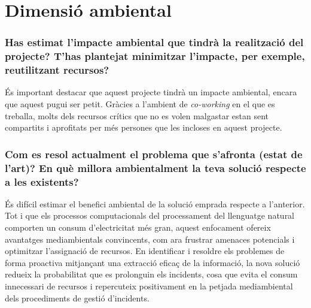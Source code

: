 \section{Dimensió ambiental}

\subsubsection{Has estimat l'impacte ambiental que tindrà la realització del projecte? T'has plantejat minimitzar l'impacte, per exemple, reutilitzant recursos?}
És important destacar que aquest projecte tindrà un impacte ambiental, encara que aquest pugui ser petit. Gràcies a l'ambient de \textit{co-working} en el que es treballa, molts dels recursos crítics que no es volen malgastar estan sent compartits i aprofitats per més persones que les incloses en aquest projecte.

\subsubsection{Com es resol actualment el problema que s'afronta (estat de l'art)? En què millora ambientalment la teva solució respecte a les existents?}
És difícil estimar el benefici ambiental de la solució emprada respecte a l'anterior. Tot i que els processos computacionals del processament del llenguatge natural comporten un consum d'electricitat més gran, aquest enfocament ofereix avantatges mediambientals convincents, com ara frustrar amenaces potencials i optimitzar l'assignació de recursos. En identificar i resoldre els problemes de forma proactiva mitjançant una extracció eficaç de la informació, la nova solució redueix la probabilitat que es prolonguin els incidents, cosa que evita el consum innecessari de recursos i repercuteix positivament en la petjada mediambiental dels procediments de gestió d'incidents.
